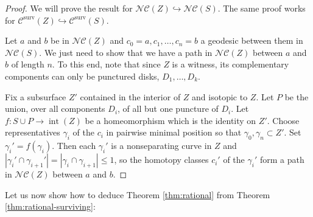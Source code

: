 \documentclass{amsart}
\newcommand{\C}{\mathcal{C}}
\newcommand{\NC}{\mathcal{NC}}
\newcommand{\ssm}{\smallsetminus}
\newcommand{\Csurv}{\C^{\text{surv}}}
\theoremstyle{definition}
\begin{document}
\begin{proof}
We will prove the result for \(\NC(Z)\hookrightarrow\NC(S)\). The same proof works for \(\Csurv(Z)\hookrightarrow\Csurv(S)\).

Let \(a\) and \(b\) be in \(\NC(Z)\) and \(c_0=a,c_1,\dots, c_n=b\) a geodesic between them in \(\NC(S)\). We just need to show that we have a path in \(\NC(Z)\) between \(a\) and \(b\) of length \(n\). To this end, note that since \(Z\) is a witness, its complementary components can only be punctured disks, \(D_1,\dots, D_k\). 

Fix a subsurface \(Z'\) contained in the interior of \(Z\) and isotopic to \(Z\). Let \(P\) be the union, over all components \(D_i\), of all but one puncture of \(D_i\). Let \(f:S\cup P\to \operatorname{int}(Z)\) be a homeomorphism which is the identity on \(Z'\). Choose representatives \(\gamma_i\) of the \(c_i\) in pairwise minimal position so that \(\gamma_0,\gamma_n\subset Z'\). Set \(\gamma_i'=f(\gamma_i)\). Then each \(\gamma_i'\) is a nonseparating curve in \(Z\) and \(|\gamma_i'\cap\gamma_{i+1}'|=|\gamma_i\cap\gamma_{i+1}|\leq 1\), so the homotopy classes \(c_i'\) of the \(\gamma_i'\) form a path in \(\NC(Z)\) between \(a\) and \(b\).
\end{proof}

Let us now show how to deduce Theorem \ref{thm:rational} from Theorem \ref{thm:rational-surviving}:
\end{document}
